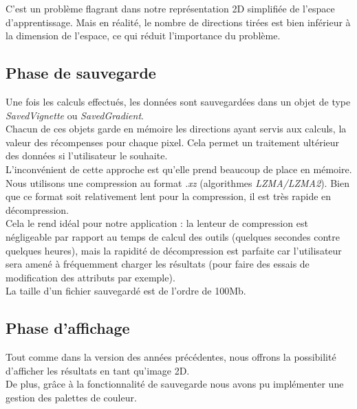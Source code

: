 \documentclass[12pt]{article}
\begin{document}
C'est un problème flagrant dans notre représentation 2D simplifiée de l'espace d'apprentissage. Mais en réalité, le nombre de directions tirées est bien inférieur à la dimension de l'espace, ce qui réduit l'importance du problème. \\

\subsection{Phase de sauvegarde}

Une fois les calculs effectués, les données sont sauvegardées dans un objet de type \emph{SavedVignette} ou \emph{SavedGradient}. \\

Chacun de ces objets garde en mémoire les directions ayant servis aux calculs, la valeur des récompenses pour chaque pixel. Cela permet un traitement ultérieur des données si l'utilisateur le souhaite. \\

L'inconvénient de cette approche est qu'elle prend beaucoup de place en mémoire. \\

Nous utilisons une compression au format \emph{.xz} (algorithmes \emph{LZMA/LZMA2}). Bien que ce format soit relativement lent pour la compression, il est très rapide en décompression. \\

Cela le rend idéal pour notre application : la lenteur de compression est négligeable par rapport au temps de calcul des outils (quelques secondes contre quelques heures), mais la rapidité de décompression est parfaite car l'utilisateur sera amené à fréquemment charger les résultats (pour faire des essais de modification des attributs par exemple). \\

La taille d'un fichier sauvegardé est de l'ordre de 100Mb. \\

\newpage
\subsection{Phase d'affichage}
\label{sec:affichage}

Tout comme dans la version des années précédentes, nous offrons la possibilité d'afficher les résultats en tant qu'image 2D. \\

De plus, grâce à la fonctionnalité de sauvegarde nous avons pu implémenter une gestion des palettes de couleur. \\
\end{document}
